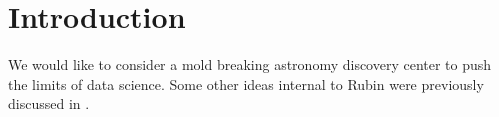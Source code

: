 
\section{Introduction}
We would like to consider a mold breaking astronomy discovery center to push the limits of data science.
Some other ideas internal to Rubin were previously discussed in .


